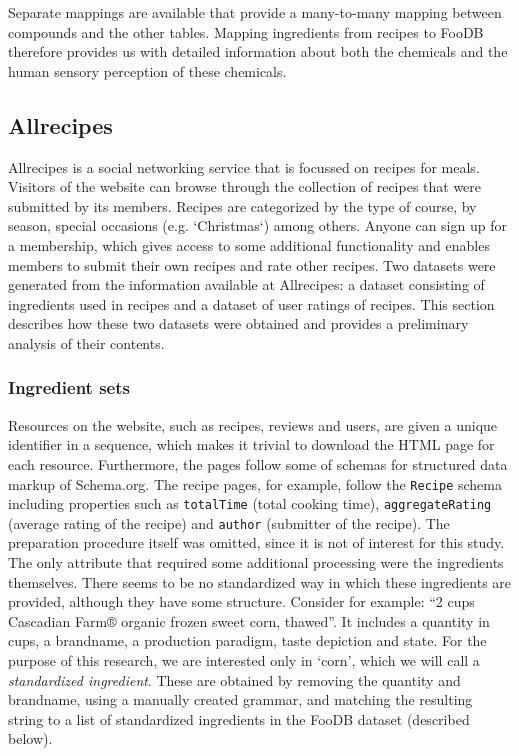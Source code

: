 Separate mappings are available that provide a many-to-many mapping between compounds and the other tables.
Mapping ingredients from recipes to FooDB therefore provides us with detailed information about both the chemicals and the human sensory perception of these chemicals.




\subsection{Allrecipes}
\label{subsec:allrecipes}

Allrecipes is a social networking service that is focussed on recipes for meals.
Visitors of the website can browse through the collection of recipes that were submitted by its members.
Recipes are categorized by the type of course, by season, special occasions (e.g. `Christmas`) among others.
Anyone can sign up for a membership, which gives access to some additional functionality and enables members to submit their own recipes and rate other recipes.
Two datasets were generated from the information available at Allrecipes: a dataset consisting of ingredients used in recipes and a dataset of user ratings of recipes.
This section describes how these two datasets were obtained and provides a preliminary analysis of their contents.




\subsubsection{Ingredient sets}
\label{subsubsec:ingredient_sets}

Resources on the website, such as recipes, reviews and users, are given a unique identifier in a sequence, which makes it trivial to download the HTML page for each resource.
Furthermore, the pages follow some of schemas for structured data markup of Schema.org.
The recipe pages, for example, follow the \texttt{Recipe} schema including properties such as \texttt{totalTime} (total cooking time), \texttt{aggregateRating} (average rating of the recipe) and \texttt{author} (submitter of the recipe).
The preparation procedure itself was omitted, since it is not of interest for this study.
The only attribute that required some additional processing were the ingredients themselves.
There seems to be no standardized way in which these ingredients are provided, although they have some structure.
Consider for example: ``2 cups Cascadian Farm® organic frozen sweet corn, thawed''.
It includes a quantity in cups, a brandname, a production paradigm, taste depiction and state.
For the purpose of this research, we are interested only in `corn', which we will call a \emph{standardized ingredient}.
These are obtained by removing the quantity and brandname, using a manually created grammar, and matching the resulting string to a list of standardized ingredients in the FooDB dataset (described below).

